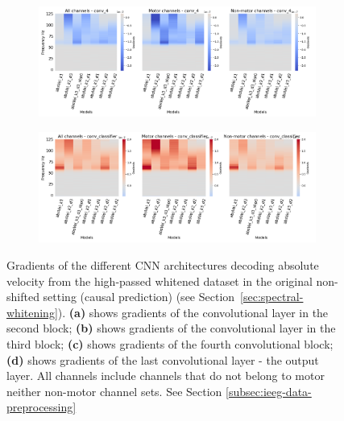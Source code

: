\begin{figure}[!htbp]\ContinuedFloat
\begin{subfigure}[b]{\textwidth}
   \includegraphics[width=1\linewidth]{img/appendix/D/conv-4/hp-m/absVel_model_gradients_all_kinds}
   \caption{}
   \label{fig:absVel-pw-hp-grads-conv-4}
\end{subfigure}

\begin{subfigure}[b]{\textwidth}
   \includegraphics[width=1\linewidth]{img/appendix/D/conv-classifier/hp-m/absVel_model_gradients_all_kinds}
   \caption{}
   \label{fig:absVel-pw-hp-grads-conv-classifier}
\end{subfigure}

\caption[]{Gradients of the different CNN architectures decoding absolute velocity from the high-passed whitened dataset in the original non-shifted setting (causal prediction) (see Section~\ref{sec:spectral-whitening}). \textbf{(a)} shows gradients of the convolutional layer in the second block; \textbf{(b)} shows gradients of the convolutional layer in the third block; \textbf{(c)} shows gradients of the fourth convolutional block; \textbf{(d)} shows gradients of the last convolutional layer - the output layer. All channels include channels that do not belong to motor neither non-motor channel sets. See Section \ref{subsec:ieeg-data-preprocessing}}
\label{fig:absVel-pw-hp-grads}
\end{figure}